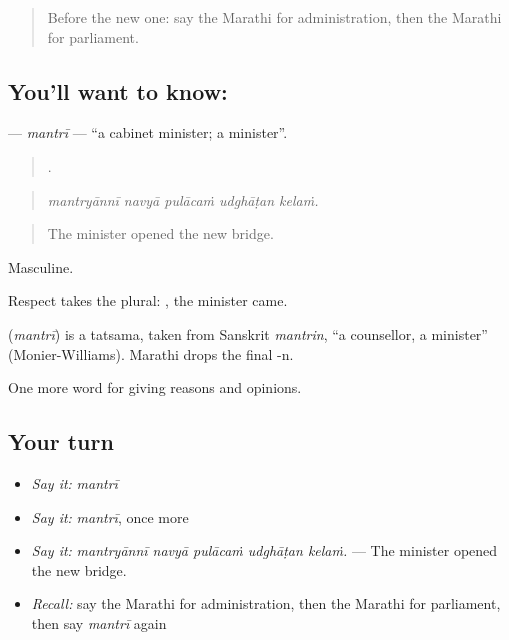 \label{lesson:MR-C357-mantri}



\begin{quote}
Before the new one: say the Marathi for administration, then the Marathi for parliament.
\end{quote}

\subsection*{You'll want to know: }
\textbf{} — \emph{mantrī} — \textquotedblleft{}a cabinet minister; a minister\textquotedblright{}.

\begin{quote}
    .
\end{quote}

\begin{quote}
\emph{mantryānnī navyā pulācaṁ udghāṭan kelaṁ.}
\end{quote}

\begin{quote}
The minister opened the new bridge.
\end{quote}

Masculine.

Respect takes the plural:  , the minister came.

\begin{cousinweb}
\textbf{} (\emph{mantrī}) is a tatsama, taken from Sanskrit \emph{mantrin}, \textquotedblleft{}a counsellor, a minister\textquotedblright{} (Monier-Williams). Marathi drops the final -n.
\end{cousinweb}

\begin{grammarlens}[title={What you've built}]
One more word for giving reasons and opinions.
\end{grammarlens}

\subsection*{Your turn}
\begin{itemize}
\raggedright
  \item \emph{Say it:} \emph{mantrī}
  \item \emph{Say it:} \emph{mantrī}, once more
  \item \emph{Say it:} \emph{mantryānnī navyā pulācaṁ udghāṭan kelaṁ.} — The minister opened the new bridge.
  \item \emph{Recall:} say the Marathi for administration, then the Marathi for parliament, then say \emph{mantrī} again
\end{itemize}

